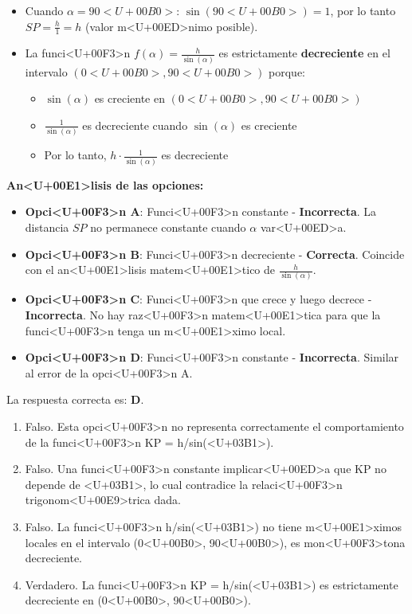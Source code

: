 \documentclass[10pt,a4paper]{article}
\newenvironment{solution}{\comment}{\endcomment}
\newenvironment{answerlist}{\renewcommand{\labelenumii}{(\alph{enumii})}\begin{enumerate}}{\end{enumerate}}
\begin{document}
\begin{enumerate}
\begin{solution}
\begin{itemize}
\item Cuando $\alpha = 90<U+00B0>$: $\sin(90<U+00B0>) = 1$, por lo tanto $SP = \frac{h}{1} = h$ (valor m<U+00ED>nimo posible).

\item La funci<U+00F3>n $f(\alpha) = \frac{h}{\sin(\alpha)}$ es estrictamente \textbf{decreciente} en el intervalo $(0<U+00B0>, 90<U+00B0>)$ porque:
  \begin{itemize}
  \item $\sin(\alpha)$ es creciente en $(0<U+00B0>, 90<U+00B0>)$
  \item $\frac{1}{\sin(\alpha)}$ es decreciente cuando $\sin(\alpha)$ es creciente
  \item Por lo tanto, $h \cdot \frac{1}{\sin(\alpha)}$ es decreciente
  \end{itemize}
\end{itemize}

\textbf{An<U+00E1>lisis de las opciones:}

\begin{itemize}
\item \textbf{Opci<U+00F3>n A}: Funci<U+00F3>n constante - \textbf{Incorrecta}. La distancia $SP$ no permanece constante cuando $\alpha$ var<U+00ED>a.

\item \textbf{Opci<U+00F3>n B}: Funci<U+00F3>n decreciente - \textbf{Correcta}. Coincide con el an<U+00E1>lisis matem<U+00E1>tico de $\frac{h}{\sin(\alpha)}$.

\item \textbf{Opci<U+00F3>n C}: Funci<U+00F3>n que crece y luego decrece - \textbf{Incorrecta}. No hay raz<U+00F3>n matem<U+00E1>tica para que la funci<U+00F3>n tenga un m<U+00E1>ximo local.

\item \textbf{Opci<U+00F3>n D}: Funci<U+00F3>n constante - \textbf{Incorrecta}. Similar al error de la opci<U+00F3>n A.
\end{itemize}

La respuesta correcta es: \textbf{D}.

\begin{answerlist}
  \item Falso. Esta opci<U+00F3>n no representa correctamente el comportamiento de la funci<U+00F3>n KP = h/sin(<U+03B1>).
  \item Falso. Una funci<U+00F3>n constante implicar<U+00ED>a que KP no depende de <U+03B1>, lo cual contradice la relaci<U+00F3>n trigonom<U+00E9>trica dada.
  \item Falso. La funci<U+00F3>n h/sin(<U+03B1>) no tiene m<U+00E1>ximos locales en el intervalo (0<U+00B0>, 90<U+00B0>), es mon<U+00F3>tona decreciente.
  \item Verdadero. La funci<U+00F3>n KP = h/sin(<U+03B1>) es estrictamente decreciente en (0<U+00B0>, 90<U+00B0>).
\end{answerlist}
\end{solution}


\end{enumerate}
\end{document}
